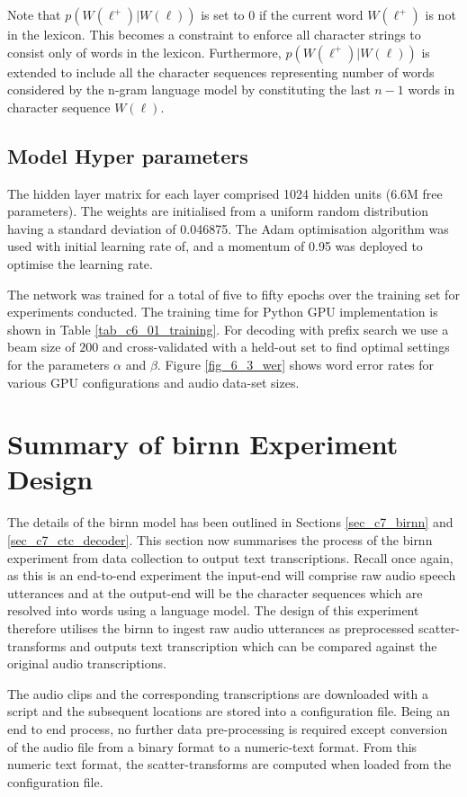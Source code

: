 Note that $p(W(\ell^+)|W(\ell))$ is set to $0$ if the current word $W(\ell^+)$ is not in the lexicon. This becomes a constraint to enforce all character strings to consist only of words in the lexicon.  Furthermore,  $p(W(\ell^+)|W(\ell))$ is extended to include all the character sequences representing number of words considered by the n-gram language model by constituting the last $n-1$ words in character sequence $W(\ell)$.

\subsection{Model Hyper parameters}
The hidden layer matrix for each layer comprised 1024 hidden units (6.6M free parameters).  The weights are initialised from a uniform random distribution having a standard deviation of 0.046875.  The Adam optimisation algorithm \citep{kingma2014adam} was used with initial learning rate of, and a momentum of 0.95 was deployed to optimise the learning rate.

The network was trained for a total of five to fifty epochs over the training set for experiments conducted. The training time for Python GPU implementation is shown in Table \ref{tab_c6_01_training}.  For decoding with prefix search we use a beam size of $200$ and cross-validated with a held-out set to find optimal settings for the parameters $\alpha$ and $\beta$. Figure \ref{fig_6_3_wer} shows word error rates for various GPU configurations and audio data-set sizes.


\section{Summary of \acrshort{birnn} Experiment Design}
The details of the \acrshort{birnn} model has been outlined in Sections \ref{sec_c7_birnn} and \ref{sec_c7_ctc_decoder}.  This section now summarises the process of the \acrshort{birnn} experiment from data collection to output text transcriptions.  Recall once again, as this is an end-to-end experiment the input-end will comprise raw audio speech utterances and at the output-end will be the character sequences which are resolved into words using a language model. The design of this experiment therefore utilises the \acrshort{birnn} to ingest raw audio utterances as preprocessed scatter-transforms and outputs text transcription which can be compared against the original audio transcriptions.

The audio clips and the corresponding transcriptions are downloaded with a script and the subsequent locations are stored into a configuration file. Being an end to end process, no further data pre-processing is required except conversion of the audio file from a binary format to a numeric-text format.  From this numeric text format, the scatter-transforms are computed when loaded from the configuration file.  

